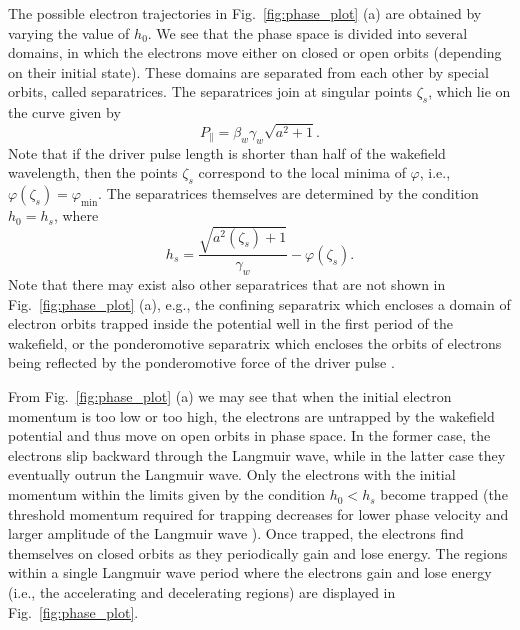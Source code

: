 \documentclass[10pt, a4paper, twoside, openright]{report}
\begin{document}
The possible electron trajectories in Fig.~\ref{fig:phase_plot} (a) are obtained by varying the value of $ h_0 $. We see that the phase space is divided into several domains, in which the electrons move either on closed or open orbits (depending on their initial state). These domains are separated from each other by special orbits, called separatrices. The separatrices join at singular points $ \zeta_s $, which lie on the curve given by \cite{Esirkepov2006}
\begin{equation}\label{eq:singular_points}
	P_{\parallel} = \beta_w \gamma_w \sqrt{a^2 + 1}.
\end{equation}
Note that if the driver pulse length is shorter than half of the wakefield wavelength, then the points $ \zeta_s $ correspond to the local minima of $ \varphi $, i.e., $ \varphi \left( \zeta_s \right) = \varphi_{\mathrm{min}} $. The separatrices themselves are determined by the condition $ h_0 = h_s $, where \cite{Esirkepov2006, Schroeder2006, Esarey2009}
\begin{equation}\label{eq:separatrix}
	h_s = \frac{\sqrt{a^2 \left( \zeta_{s} \right) + 1}}{\gamma_w} - \varphi \left( \zeta_{s} \right).
\end{equation}
Note that there may exist also other separatrices that are not shown in Fig.~\ref{fig:phase_plot} (a), e.g., the confining separatrix which encloses a domain of electron orbits trapped inside the potential well in the first period of the wakefield, or the ponderomotive separatrix which encloses the orbits of electrons being reflected by the ponderomotive force of the driver pulse \cite{Esirkepov2006}.

From Fig.~\ref{fig:phase_plot} (a) we may see that when the initial electron momentum is too low or too high, the electrons are untrapped by the wakefield potential and thus move on open orbits in phase space. In the former case, the electrons slip backward through the Langmuir wave, while in the latter case they eventually outrun the Langmuir wave. Only the electrons with the initial momentum within the limits given by the condition $ h_0 < h_s $ become trapped (the threshold momentum required for trapping decreases for lower phase velocity and larger amplitude of the Langmuir wave \cite{Schroeder2006}). Once trapped, the electrons find themselves on closed orbits as they periodically gain and lose energy. The regions within a single Langmuir wave period where the electrons gain and lose energy (i.e., the accelerating and decelerating regions) are displayed in Fig.~\ref{fig:phase_plot}. 
\end{document}
